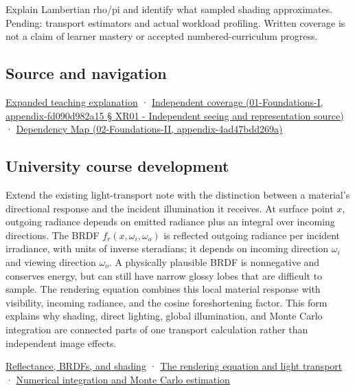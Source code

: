 Explain Lambertian rho/pi and identify what sampled shading approximates. Pending: transport estimators and actual workload profiling. Written coverage is not a claim of learner mastery or accepted numbered-curriculum progress.

\subsection{Source and navigation}\label{source-and-navigation}

\href{Continuous\%20Notes/University\%20-\%20Worlds,\%20Images\%20and\%20Inference\%20-\%20Graphics,\%20Vision\%20and\%20Photography\#Materials\%20turn\%20incoming\%20light\%20into\%20outgoing\%20light}{Expanded teaching explanation} · \href{}{Independent coverage (01-Foundations-I, appendix-fd090d982a15 § XR01 - Independent seeing and representation source)} · \href{}{Dependency Map (02-Foundations-II, appendix-4ad47bdd269a)}

\subsection{University course development}\label{university-course-development}

Extend the existing light-transport note with the distinction between a material's directional response and the incident illumination it receives. At surface point \(x\), outgoing radiance depends on emitted radiance plus an integral over incoming directions. The BRDF \(f_r(x,\omega_i,\omega_o)\) is reflected outgoing radiance per incident irradiance, with units of inverse steradians; it depends on incoming direction \(\omega_i\) and viewing direction \(\omega_o\). A physically plausible BRDF is nonnegative and conserves energy, but can still have narrow glossy lobes that are difficult to sample. The rendering equation combines this local material response with visibility, incoming radiance, and the cosine foreshortening factor. This form explains why shading, direct lighting, global illumination, and Monte Carlo integration are connected parts of one transport calculation rather than independent image effects.

\href{Continuous\%20Notes/University\%20-\%20Worlds,\%20Images\%20and\%20Inference\%20-\%20Graphics,\%20Vision\%20and\%20Photography\#Reflectance,\%20BRDFs,\%20and\%20shading}{Reflectance, BRDFs, and shading} · \href{Continuous\%20Notes/University\%20-\%20Worlds,\%20Images\%20and\%20Inference\%20-\%20Graphics,\%20Vision\%20and\%20Photography\#The\%20rendering\%20equation\%20and\%20light\%20transport}{The rendering equation and light transport} · \href{Continuous\%20Notes/University\%20-\%20Worlds,\%20Images\%20and\%20Inference\%20-\%20Graphics,\%20Vision\%20and\%20Photography\#Numerical\%20integration\%20and\%20Monte\%20Carlo\%20estimation}{Numerical integration and Monte Carlo estimation}
